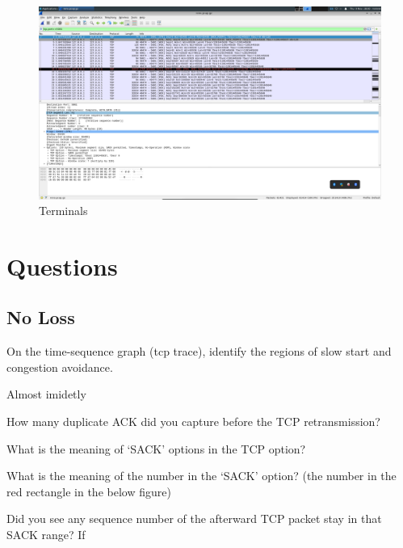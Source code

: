 \documentclass{article}
\begin{document}
\begin{figure}[htp]
    \centering
    \includegraphics[width=.9\textwidth]{screenshot}%
    \caption{Terminals}
\end{figure}

\clearpage
\section*{Questions}
\subsection*{No Loss}
\noindent
On the time-sequence graph (tcp trace), identify the regions of slow start and
congestion avoidance.

Almost imidetly 

\noindent
How many duplicate ACK did you capture before the TCP retransmission?

\noindent
What is the meaning of `SACK' options in the TCP option?

\noindent
What is the meaning of the number in the `SACK' option? (the number in the red
rectangle in the below figure)

\noindent
Did you see any sequence number of the afterward TCP packet stay in that SACK range? If
\end{document}
